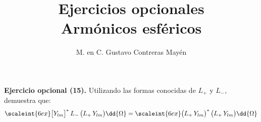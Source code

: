 
\title{Ejercicios opcionales \\[0.3em]  \large{Armónicos esféricos} \vspace{-3ex}}
\author{M. en C. Gustavo Contreras Mayén}
\date{ }


\vspace{-4cm}
\maketitle
\fontsize{14}{14}\selectfont
\noindent
\textbf{Ejercicio opcional (15).} Utilizando las formas conocidas de $L_{+}$ y $L_{-}$, demuestra que:
\begin{align*}
\scaleint{6ex} \big[ Y_{lm} \big]^{*} \, L_{-} \, \big( L_{+} \, Y_{lm} \big) \dd{\Omega} = \scaleint{6ex} \big( L_{+} \, Y_{lm} \big)^{*} \, \big( L_{+} \, Y_{lm} \big) \dd{\Omega}
\end{align*}

